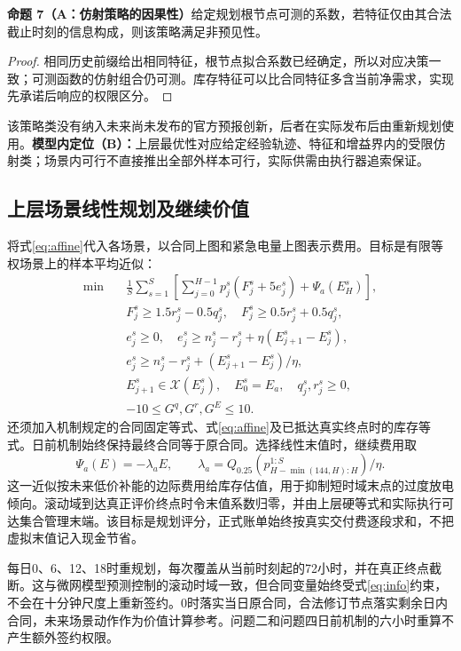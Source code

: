\documentclass[UTF8,a4paper,zihao=-4,fontset=mac]{ctexart}
\newcommand{\pp}[2]{\par\noindent\textbf{命题 #1（#2）}\quad}
\begin{document}
\pp{7}{A：仿射策略的因果性}给定规划根节点可测的系数，若特征仅由其合法截止时刻的信息构成，则该策略满足非预见性。
\begin{proof}
相同历史前缀给出相同特征，根节点拟合系数已经确定，所以对应决策一致；可测函数的仿射组合仍可测。库存特征可以比合同特征多含当前净需求，实现先承诺后响应的权限区分。
\end{proof}
该策略类没有纳入未来尚未发布的官方预报创新，后者在实际发布后由重新规划使用。\textbf{模型内定位（B）：}上层最优性对应给定经验轨迹、特征和增益界内的受限仿射类；场景内可行不直接推出全部外样本可行，实际供需由执行器追索保证。

\subsection{上层场景线性规划及继续价值}
将式\eqref{eq:affine}代入各场景，以合同上图和紧急电量上图表示费用。目标是有限等权场景上的样本平均近似\cite{kleywegt2002,shapiro2014}：
\begin{equation}\label{eq:saa}
\begin{aligned}
\min\quad&\frac1S\sum_{s=1}^S\left[\sum_{j=0}^{H-1}p_j^s(F_j^s+5e_j^s)+\Psi_a(E_H^s)\right],\\
&F_j^s\ge1.5r_j^s-0.5q_j^s,\quad F_j^s\ge0.5r_j^s+0.5q_j^s,\\
&e_j^s\ge0,\quad e_j^s\ge n_j^s-r_j^s+\eta(E_{j+1}^s-E_j^s),\\
&e_j^s\ge n_j^s-r_j^s+(E_{j+1}^s-E_j^s)/\eta,\\
&E_{j+1}^s\in\mathcal X(E_j^s),\quad E_0^s=E_a,\quad q_j^s,r_j^s\ge0,\\
&-10\le G^q,G^r,G^E\le10.
\end{aligned}
\end{equation}
还须加入机制规定的合同固定等式、式\eqref{eq:affine}及已抵达真实终点时的库存等式。日前机制始终保持最终合同等于原合同。选择线性末值时，继续费用取
\begin{equation}\label{eq:tail}
 \Psi_a(E)=-\lambda_a E,\qquad
 \lambda_a=Q_{0.25}(p_{H-\min(144,H):H}^{1:S})/\eta.
\end{equation}
这一近似按未来低价补能的边际费用给库存估值，用于抑制短时域末点的过度放电倾向。滚动域到达真正评价终点时令末值系数归零，并由上层硬等式和实际执行可达集合管理末端。该目标是规划评分，正式账单始终按真实交付费逐段求和，不把虚拟末值记入现金节省。

每日0、6、12、18时重规划，每次覆盖从当前时刻起的72小时，并在真正终点截断。这与微网模型预测控制的滚动时域一致\cite{parisio2014,parisio2016}，但合同变量始终受式\eqref{eq:info}约束，不会在十分钟尺度上重新签约。0时落实当日原合同，合法修订节点落实剩余日内合同，未来场景动作作为价值计算参考。问题二和问题四日前机制的六小时重算不产生额外签约权限。
\end{document}
